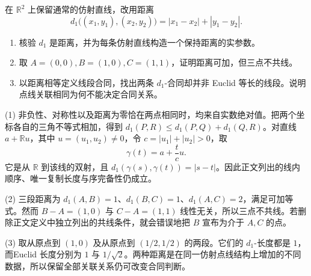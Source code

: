\begin{exercise}
	\label{g1:ex:taxicab-betweenness}
	在 \(\mathbb R^2\) 上保留通常的仿射直线，改用距离
	\[
		d_1\bigl((x_1,y_1),(x_2,y_2)\bigr)=|x_1-x_2|+|y_1-y_2|.
	\]
	\begin{enumerate}
		\item 核验 \(d_1\) 是距离，并为每条仿射直线构造一个保持距离的实参数。
		\item 取 \(A=(0,0),B=(1,0),C=(1,1)\)，证明距离可加，但三点不共线。
		\item 以距离相等定义线段合同，找出两条 \(d_1\)-合同却并非 Euclid 等长的线段。说明点线关联相同为何不能决定合同关系。
	\end{enumerate}
\end{exercise}
\begin{solution}
	(1) 非负性、对称性以及距离为零恰在两点相同时，均来自实数绝对值。把两个坐标各自的三角不等式相加，得到 \(d_1(P,R)\le d_1(P,Q)+d_1(Q,R)\)。对直线 \(a+\mathbb R u\)，其中 \(u=(u_1,u_2)\ne0\)，令 \(c=|u_1|+|u_2|>0\)，取
	\[
		\gamma(t)=a+\frac{t}{c}u.
	\]
	它是从 \(\mathbb R\) 到该线的双射，且 \(d_1(\gamma(s),\gamma(t))=|s-t|\)。因此正文列出的线内顺序、唯一复制长度与序完备性仍成立。

	(2) 三段距离为 \(d_1(A,B)=1\)、\(d_1(B,C)=1\)、\(d_1(A,C)=2\)，满足可加等式。然而 \(B-A=(1,0)\) 与 \(C-A=(1,1)\) 线性无关，所以三点不共线。若删除正文定义中独立列出的共线条件，就会错误地把 \(B\) 宣布为介于 \(A,C\) 的点。

	(3) 取从原点到 \((1,0)\) 及从原点到 \((1/2,1/2)\) 的两段。它们的 \(d_1\)-长度都是 \(1\)，而Euclid 长度分别为 \(1\) 与 \(1/\sqrt2\)。两种距离是在同一仿射点线结构上增加的不同数据，所以保留全部关联关系仍可改变合同判断。
\end{solution}

